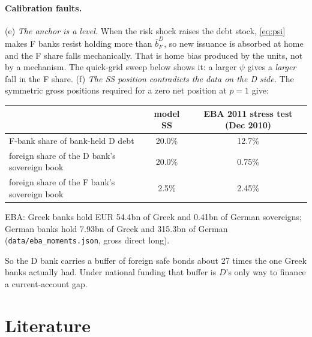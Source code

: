 \documentclass[11pt]{article}
\newcommand{\code}[1]{\texttt{\small #1}}
\begin{document}
\paragraph{Calibration faults.} (e) \emph{The anchor is a level.} When the risk shock raises the
debt stock, \eqref{eq:psi} makes F banks resist holding more than $\bar b^D_F$, so new issuance is
absorbed at home and the F share falls mechanically. That is home bias produced by the units, not
by a mechanism. The quick-grid sweep below shows it: a larger $\psi$ gives a \emph{larger} fall
in the F share. (f) \emph{The SS position contradicts the data on the D side.} The symmetric gross
positions required for a zero net position at $p=1$ give:

\begin{center}
\small
\begin{tabular}{lcc}
\toprule
& model SS & EBA 2011 stress test (Dec 2010)\\
\midrule
F-bank share of bank-held D debt & 20.0\% & 12.7\%\\
foreign share of the D bank's sovereign book & 20.0\% & 0.75\%\\
foreign share of the F bank's sovereign book & 2.5\% & 2.45\%\\
\bottomrule
\end{tabular}
\end{center}
{\footnotesize EBA: Greek banks hold EUR 54.4bn of Greek and 0.41bn of German sovereigns; German
banks hold 7.93bn of Greek and 315.3bn of German (\code{data/eba\_moments.json}, gross direct long).}

So the D bank carries a buffer of foreign safe bonds about 27 times the one Greek banks
actually had. Under national funding that buffer is $D$'s only way to finance a current-account
gap.

\section{Literature}
\label{sec:lit}
\end{document}
